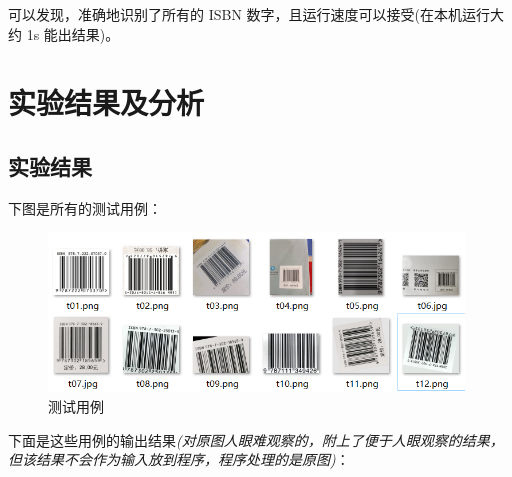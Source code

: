\documentclass{ctexart}
\begin{document}
可以发现，准确地识别了所有的 ISBN 数字，且运行速度可以接受(在本机运行大约 1s 能出结果)。

\section{实验结果及分析}
\subsection{实验结果}

下图是所有的测试用例：

\begin{figure}[H]
    \centering
    \includegraphics[height=120pt]{test_raw}
    \caption{测试用例}
\end{figure}

下面是这些用例的输出结果\textit{(对原图人眼难观察的，附上了便于人眼观察的结果，但该结果不会作为输入放到程序，程序处理的是原图)}：
\end{document}
